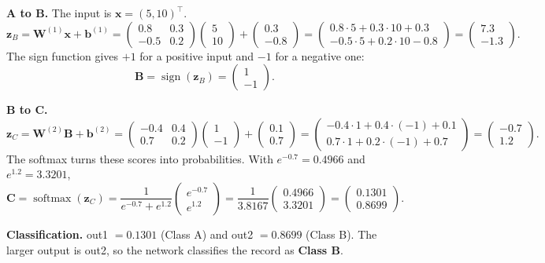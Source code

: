 \documentclass[11pt]{article}
\begin{document}
\textbf{A to B.} The input is $\bm{x} = (5, 10)^\top$.
\[
\bm{z}_B = \bm{W}^{(1)} \bm{x} + \bm{b}^{(1)}
= \begin{pmatrix} 0.8 & 0.3 \\ -0.5 & 0.2 \end{pmatrix} \begin{pmatrix} 5 \\ 10 \end{pmatrix}
+ \begin{pmatrix} 0.3 \\ -0.8 \end{pmatrix}
= \begin{pmatrix} 0.8 \cdot 5 + 0.3 \cdot 10 + 0.3 \\ -0.5 \cdot 5 + 0.2 \cdot 10 - 0.8 \end{pmatrix}
= \begin{pmatrix} 7.3 \\ -1.3 \end{pmatrix}.
\]
The sign function gives $+1$ for a positive input and $-1$ for a negative one:
\[
\bm{B} = \operatorname{sign}(\bm{z}_B) = \begin{pmatrix} 1 \\ -1 \end{pmatrix}.
\]

\textbf{B to C.}
\[
\bm{z}_C = \bm{W}^{(2)} \bm{B} + \bm{b}^{(2)}
= \begin{pmatrix} -0.4 & 0.4 \\ 0.7 & 0.2 \end{pmatrix} \begin{pmatrix} 1 \\ -1 \end{pmatrix}
+ \begin{pmatrix} 0.1 \\ 0.7 \end{pmatrix}
= \begin{pmatrix} -0.4 \cdot 1 + 0.4 \cdot (-1) + 0.1 \\ 0.7 \cdot 1 + 0.2 \cdot (-1) + 0.7 \end{pmatrix}
= \begin{pmatrix} -0.7 \\ 1.2 \end{pmatrix}.
\]
The softmax turns these scores into probabilities. With $e^{-0.7} = 0.4966$ and $e^{1.2} = 3.3201$,
\[
\bm{C} = \operatorname{softmax}(\bm{z}_C)
= \frac{1}{e^{-0.7} + e^{1.2}} \begin{pmatrix} e^{-0.7} \\ e^{1.2} \end{pmatrix}
= \frac{1}{3.8167} \begin{pmatrix} 0.4966 \\ 3.3201 \end{pmatrix}
= \begin{pmatrix} 0.1301 \\ 0.8699 \end{pmatrix}.
\]

\textbf{Classification.} out1 $= 0.1301$ (Class A) and out2 $= 0.8699$ (Class B). The larger output is
out2, so the network classifies the record as \textbf{Class B}.
\end{document}
